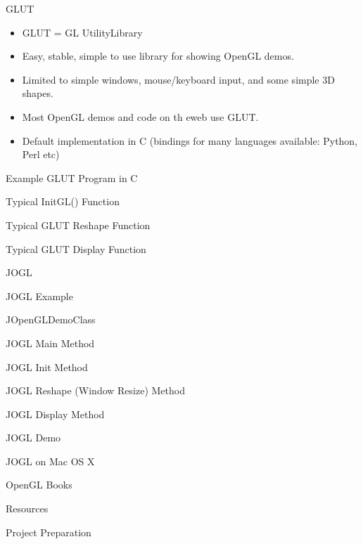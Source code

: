 \documentclass[xcolor=dvipsnames,t]{beamer}
\newcommand{\showcode}[1]{\begin{mdframed}[style=code] %
                          \end{mdframed}%
}
\begin{document}
\begin{frame}{GLUT} 
    \begin{itemize} 
        \item GLUT = GL UtilityLibrary
        \item Easy, stable, simple to use library for showing OpenGL demos.
        \item Limited to simple windows, mouse/keyboard input, and some simple 3D shapes.
        \item Most OpenGL demos and code on th eweb use GLUT.
        \item Default implementation in C
             (bindings for many languages available: Python, Perl etc)
    \end{itemize} 
\end{frame} 

\begin{frame}{Example GLUT Program in C} 
    \showcode{glutmain.c} 
\end{frame} 

\begin{frame}{Typical InitGL() Function} 
    \showcode{initgl.c} 
\end{frame} 

\begin{frame}{Typical GLUT Reshape Function} 
    \showcode{reshape.c} 
\end{frame} 

\begin{frame}{Typical GLUT Display Function} 
    \showcode{display.c} 
\end{frame} 

\begin{frame}{JOGL} 
\end{frame} 

\begin{frame}{JOGL Example} 
\end{frame} 

\begin{frame}{JOpenGLDemoClass}
\end{frame} 

\begin{frame}{JOGL Main Method} 
\end{frame} 

\begin{frame}{JOGL Init Method} 
\end{frame} 

\begin{frame}{JOGL Reshape (Window Resize) Method} 
\end{frame}

\begin{frame}{JOGL Display Method} 
\end{frame} 

\begin{frame}{JOGL Demo} 
\end{frame} 

\begin{frame}{JOGL on Mac OS X} 
\end{frame} 

\begin{frame}{OpenGL Books} 
\end{frame} 

\begin{frame}{Resources} 
\end{frame} 

\begin{frame}{Project Preparation} 
\end{frame} 
\end{document}
